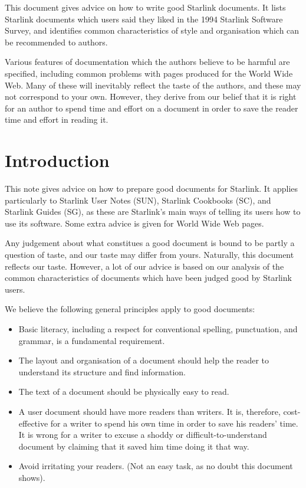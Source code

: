 \documentclass[twoside,11pt]{article}
\newcommand{\stardocinitials}  {SGP}
\newcommand{\stardocnumber}    {28.8}
\newcommand{\stardocabstract}  {
  This document gives advice on how to write good Starlink documents.
  It lists Starlink documents which users said they liked in the 1994
  Starlink Software Survey, and identifies common characteristics of style
  and organisation which can be recommended to authors.

  Various features of documentation which the authors believe to be harmful
  are specified, including common problems with pages produced for
  the World Wide Web.
  Many of these will inevitably reflect the taste of the authors, and these
  may not correspond to your own.
  However, they derive from our belief that it is right for an author
  to spend time and effort on a document in order to save the reader time
  and effort in reading it.
}
\newcommand{\stardocname}{\stardocinitials /\stardocnumber}
\newenvironment{latexonly}{}{}
\renewcommand{\thepage}{\roman{page}}
\begin{document}
\stardocabstract
\newpage
\begin{latexonly}
   \setlength{\parskip}{0mm}
   \tableofcontents
   \setlength{\parskip}{\medskipamount}
   \markright{\stardocname}
\end{latexonly}
\newpage
\renewcommand{\thepage}{\arabic{page}}
\setcounter{page}{1}

\section{Introduction}

This note gives advice on how to prepare good documents for Starlink.
It applies particularly to Starlink User Notes (SUN), Starlink Cookbooks (SC),
and Starlink Guides (SG), as these are Starlink's main ways of telling its users
how to use its software.
Some extra advice is given for World Wide Web pages.

Any judgement about what constitues a good document is bound to be partly a
question of taste, and our taste may differ from yours.
Naturally, this document reflects our taste.
However, a lot of our advice is based on our analysis of the common
characteristics of documents which have been judged good by Starlink users.

We believe the following general principles apply to good documents:

\begin{itemize}
\item Basic literacy, including a respect for conventional spelling,
punctuation, and grammar, is a fundamental requirement.
\item The layout and organisation of a document should help the reader to
understand its structure and find information.
\item The text of a document should be physically easy to read.
\item A user document should have more readers than writers.
It is, therefore, cost-effective for a writer to spend his own time in order
to save his readers' time.
It is wrong for a writer to excuse a shoddy or difficult-to-understand document
by claiming that it saved him time doing it that way.
\item Avoid irritating your readers.
(Not an easy task, as no doubt this document shows).
\end{itemize}
\end{document}
